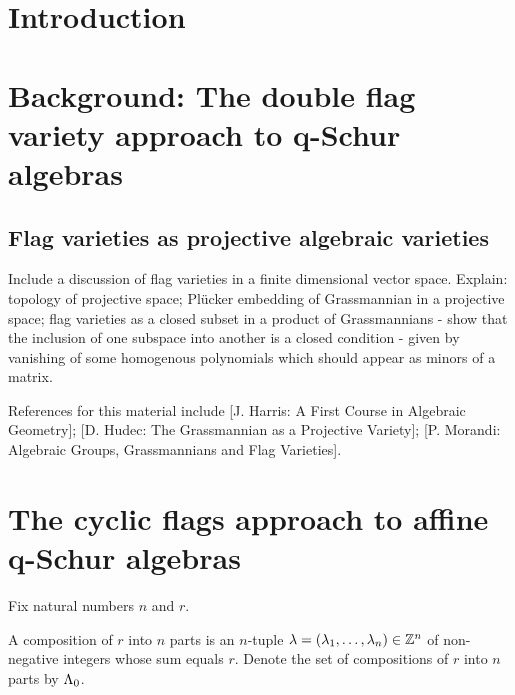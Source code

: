 \documentclass[a4paper, 11pt]{report}
\begin{document}
\maketitle

\tableofcontents

\chapter{Introduction}

\chapter{Background: The double flag variety approach to q-Schur algebras}

\section{Flag varieties as projective algebraic varieties}

{\color{blue}Include a discussion of flag varieties in a finite dimensional vector space. Explain: topology of projective space; Pl\"{u}cker embedding of Grassmannian in a projective space; flag varieties as a closed subset in a product of Grassmannians - show that the inclusion of one subspace into another is a closed condition - given by vanishing of some homogenous polynomials which should appear as minors of a matrix.}

References for this material include \cite{harris13}[J. Harris: A First Course in Algebraic Geometry]; \cite{hu07}[D. Hudec: The Grassmannian as a Projective Variety]; \cite{morandi98}[P. Morandi: Algebraic Groups, Grassmannians and Flag Varieties].

\chapter{The cyclic flags approach to affine q-Schur algebras}

Fix natural numbers $n$ and $r$.

\begin{definition}[compositions]\label{def:compositions}
A composition of $r$ into $n$ parts is an $n$-tuple $\lambda=(\lambda_1,\ldots,\lambda_n)\in\mathbb{Z}^n$ of non-negative integers whose sum equals $r$. Denote the set of compositions of $r$ into $n$ parts by ${\Lambda_0}$.
\end{definition}
\end{document}
